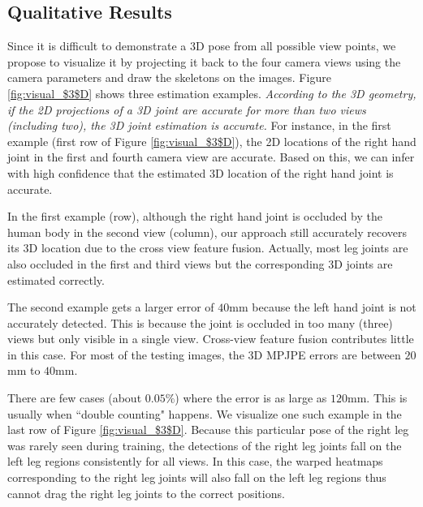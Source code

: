 \documentclass[10pt,twocolumn,letterpaper]{article}
\begin{document}
\subsection{Qualitative Results}
Since it is difficult to demonstrate a $3$D pose from all possible view points, we propose to visualize it by projecting it back to the four camera views using the camera parameters and draw the skeletons on the images.
Figure \ref{fig:visual_$3$D} shows three estimation examples.
\emph{According to the 3D geometry, if the 2D projections of a 3D joint are accurate for more than two views (including two), the 3D joint estimation is accurate.} For instance, in the first example (first row of Figure \ref{fig:visual_$3$D}), the 2D locations of the right hand joint in the first and fourth camera view are accurate. Based on this, we can infer with high confidence that the estimated 3D location of the right hand joint is accurate.

 In the first example (row), although the right hand joint is occluded by the human body in the second view (column), our approach still accurately recovers its $3$D location due to the cross view feature fusion. Actually, most leg joints are also occluded in the first and third views but the corresponding 3D joints are estimated correctly. 
 
 The second example gets a larger error of $40$mm because the left hand joint is not accurately detected. This is because the joint is occluded in too many (three) views but only visible in a single view. Cross-view feature fusion contributes little in this case. For most of the testing images, the $3$D MPJPE errors are between $20$mm to $40$mm. 
 
 There are few cases (about $0.05\%$) where the error is as large as $120$mm. This is usually when ``double counting" happens. We visualize one such example in the last row of Figure \ref{fig:visual_$3$D}.  Because this particular pose of the right leg was rarely seen during training, the detections of the right leg joints fall on the left leg regions consistently for all views. In this case, the warped heatmaps corresponding to the right leg joints will also fall on the left leg regions thus cannot drag the right leg joints to the correct positions.
\end{document}

